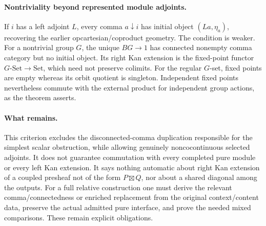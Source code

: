 \documentclass{article}
\begin{document}
\paragraph{Nontriviality beyond represented module adjoints.} If $i$ has a left adjoint $L$, every comma $a\downarrow i$ has initial object $(La,\eta_a)$, recovering the earlier opcartesian/coproduct geometry. The condition is weaker. For a nontrivial group $G$, the unique $BG\to1$ has connected nonempty comma category but no initial object. Its right Kan extension is the fixed-point functor $G\text{-}\mathrm{Set}\to\mathrm{Set}$, which need not preserve colimits. For the regular $G$-set, fixed points are empty whereas its orbit quotient is singleton. Independent fixed points nevertheless commute with the external product for independent group actions, as the theorem asserts.

\paragraph{What remains.} This criterion excludes the disconnected-comma duplication responsible for the simplest scalar obstruction, while allowing genuinely noncocontinuous selected adjoints. It does not guarantee commutation with every completed pure module or every left Kan extension. It says nothing automatic about right Kan extension of a coupled presheaf not of the form $P\boxtimes Q$, nor about a shared diagonal among the outputs. For a full relative construction one must derive the relevant comma/connectedness or enriched replacement from the original context/content data, preserve the actual admitted pure interface, and prove the needed mixed comparisons. These remain explicit obligations.
\end{document}
